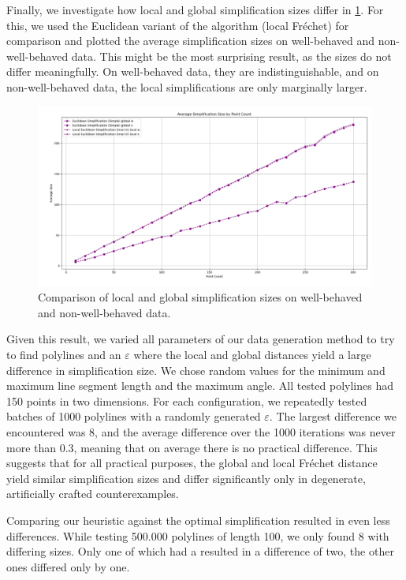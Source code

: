 Finally, we investigate how local and global simplification sizes differ in \cref{fig:res-local-global}. For this, we used the Euclidean variant of the \citeauthor{computational_geometric_methods_for_polygonal_approximations_of_a_curve} algorithm (local Fréchet) for comparison and plotted the average simplification sizes on well-behaved and non-well-behaved data. This might be the most surprising result, as the sizes do not differ meaningfully. On well-behaved data, they are indistinguishable, and on non-well-behaved data, the local simplifications are only marginally larger.

\begin{figure}[b]
  \centering
	\includegraphics[scale=0.4]{./figures/res_local_global.png}
  \caption{Comparison of local and global simplification sizes on well-behaved and non-well-behaved data.}
  \label{fig:res-local-global}
\end{figure}

Given this result, we varied all parameters of our data generation method to try to find polylines and an \(\varepsilon\) where the local and global distances yield a large difference in simplification size. We chose random values for the minimum and maximum line segment length and the maximum angle. All tested polylines had 150 points in two dimensions. For each configuration, we repeatedly tested batches of 1000 polylines with a randomly generated \(\varepsilon\). The largest difference we encountered was 8, and the average difference over the 1000 iterations was never more than 0.3, meaning that on average there is no practical difference. This suggests that for all practical purposes, the global and local Fréchet distance yield similar simplification sizes and differ significantly only in degenerate, artificially crafted counterexamples.

Comparing our heuristic against the optimal simplification resulted in even less differences. While testing 500.000 polylines of length 100, we only found 8 with differing sizes. Only one of which had a resulted in a difference of two, the other ones differed only by one.

